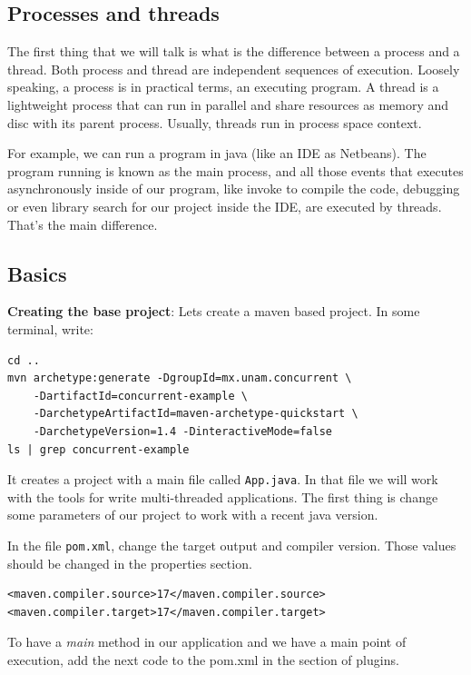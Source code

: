 \documentclass[openany, a4paper]{book}
\theoremstyle{break}
\theoremstyle{example}
\theoremstyle{note}
\theoremstyle{break}
\theoremstyle{exercise}
\begin{document}
\subsection{Processes and threads}
\label{sec:orgb546cb4}

The first thing that we will talk is what is the difference between a process
and a thread. Both process and thread are independent sequences of
execution. Loosely speaking, a process is in practical terms, an executing
program. A thread is a lightweight process that can run in parallel and share
resources as memory and disc with its parent process. Usually, threads run in
process space context.

For example, we can run a program in java (like an IDE as Netbeans). The
program running is known as the main process, and all those events that
executes asynchronously inside of our program, like invoke to compile the
code, debugging or even library search for our project inside the IDE, are
executed by threads. That's the main difference.

\subsection{Basics}
\label{sec:org20f6118}

\textbf{Creating the base project}: Lets create a maven based project. In some
terminal, write:

\begin{verbatim}
cd ..
mvn archetype:generate -DgroupId=mx.unam.concurrent \
    -DartifactId=concurrent-example \
    -DarchetypeArtifactId=maven-archetype-quickstart \
    -DarchetypeVersion=1.4 -DinteractiveMode=false
ls | grep concurrent-example
\end{verbatim}

It creates a project with a main file called \texttt{App.java}. In that file we
will work with the tools for write multi-threaded applications. The first
thing is change some parameters of our project to work with a recent
java version.

In the file \texttt{pom.xml}, change the target output and compiler version. Those
values should be changed in the properties section.

\begin{verbatim}
<maven.compiler.source>17</maven.compiler.source>
<maven.compiler.target>17</maven.compiler.target>
\end{verbatim}

To have a \emph{main} method in our application and we have a main point of
execution, add the next code to the pom.xml in the section of plugins.
\end{document}
